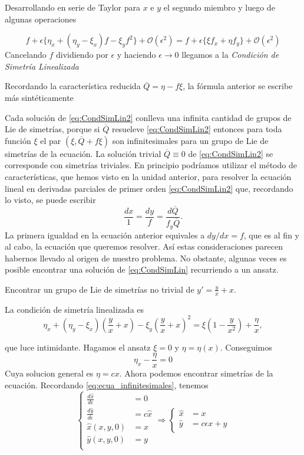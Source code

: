 Desarrollando en serie de Taylor para $x$ e $y$ el segundo miembro y luego de algunas operaciones

\[f+\epsilon\{\eta_x+(\eta_y-\xi_x)f-\xi_yf^2\}+\mathcal{O}(\epsilon^2)=
 f+\epsilon\{\xi f_x+\eta f_y\}+\mathcal{O}(\epsilon^2)
\]
Cancelando $f$ dividiendo por $\epsilon$ y haciendo $\epsilon\to 0$ llegamos a la 
\emph{Condición de Simetría Linealizada}


Recordando la característica reducida $\overline{Q}= \eta-f\xi$, la fórmula anterior se escribe más sintéticamente

Cada solución de \eqref{eq:CondSimLin2} conlleva una infinita cantidad de grupos de Lie de simetrías, porque si $\overline{Q}$ resueleve  \eqref{eq:CondSimLin2}  entonces para toda función $\xi$ el par $(\xi, \overline{Q}+f\xi)$ son infinitesimales para un grupo de Lie de simetrías de la ecuación. La solución trivial $\overline{Q}\equiv 0$ de  \eqref{eq:CondSimLin2}  se corresponde con simetrías triviales. En principio podríamos utilizar el método de características, que hemos visto en la unidad anterior, para resolver la ecuación lineal en derivadas parciales de primer orden \eqref{eq:CondSimLin2} que, recordando lo visto, se puede escribir
\[ \frac{dx}{1}=\frac{dy}{f}=\frac{d\overline{Q}}{f_y\overline{Q}}.\]
La primera igualdad en la ecuación anterior equivales a $dy/dx=f$, que es al fin y al cabo, la ecuación que queremos resolver. Así estas consideraciones parecen habernos llevado al origen de nuestro problema. No obstante, algunas veces es posible encontrar una solución de \eqref{eq:CondSimLin} recurriendo a un ansatz.

 \begin{ejemplo}{} Encontrar un grupo de Lie de simetrías no trivial de $y'=\frac{y}{x}+x$.
   \end{ejemplo}


 
 La condición de simetría linealizada es
 \[\eta_x+(\eta_y-\xi_x)\left(\frac{y}{x}+x\right)-\xi_y\left(\frac{y}{x}+x\right)^2
 =\xi \left(1-\frac{y}{x^2}\right)
+\frac{\eta}{x},\] 

que luce intimidante. Hagamos el ansatz $\xi=0$ y $\eta=\eta(x)$. Conseguimos
\[\eta_x-\frac{\eta}{x}=0\]
Cuya solucion general es $\boxed{\eta=cx}$. Ahora podemos encontrar simetrías de la ecuación. Recordando \eqref{eq:ecua_infinitesimales}, tenemos
\[
\left\{
\begin{array}{ll}
\frac{d\hat{x}}{d\epsilon}&=0\\
\frac{d\hat{y}}{d\epsilon}&=c\hat{x}\\
\hat{x}(x,y,0)&=x\\
\hat{y}(x,y,0)&=y\\
\end{array}
\right. 
\Rightarrow 
\left\{
\begin{array}{ll}
\hat{x}&=x\\
\hat{y}&=c\epsilon x+y\\
\end{array}
\right.
\]

